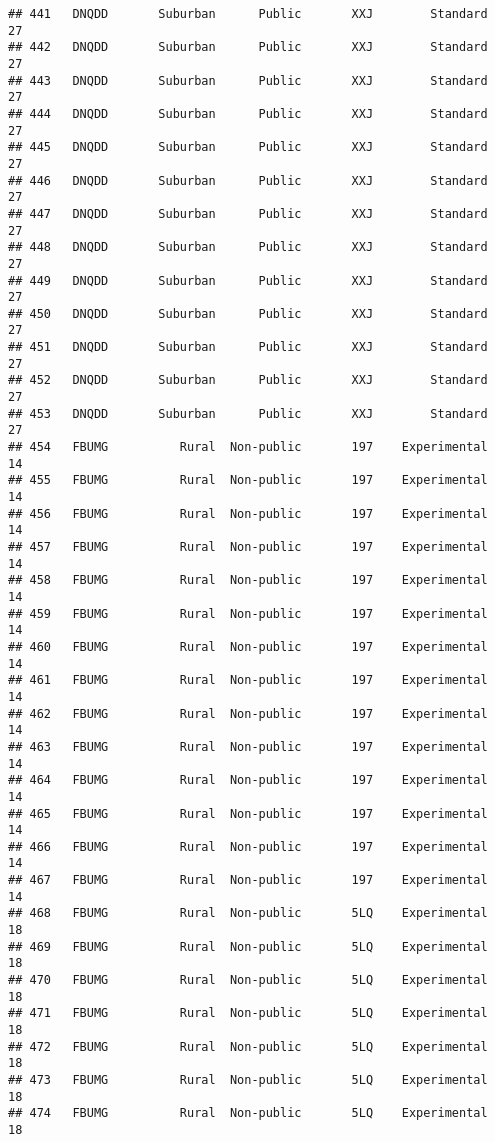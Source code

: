 \documentclass[
]{article}
\begin{document}
\begin{verbatim}
## 441   DNQDD       Suburban      Public       XXJ        Standard        27
## 442   DNQDD       Suburban      Public       XXJ        Standard        27
## 443   DNQDD       Suburban      Public       XXJ        Standard        27
## 444   DNQDD       Suburban      Public       XXJ        Standard        27
## 445   DNQDD       Suburban      Public       XXJ        Standard        27
## 446   DNQDD       Suburban      Public       XXJ        Standard        27
## 447   DNQDD       Suburban      Public       XXJ        Standard        27
## 448   DNQDD       Suburban      Public       XXJ        Standard        27
## 449   DNQDD       Suburban      Public       XXJ        Standard        27
## 450   DNQDD       Suburban      Public       XXJ        Standard        27
## 451   DNQDD       Suburban      Public       XXJ        Standard        27
## 452   DNQDD       Suburban      Public       XXJ        Standard        27
## 453   DNQDD       Suburban      Public       XXJ        Standard        27
## 454   FBUMG          Rural  Non-public       197    Experimental        14
## 455   FBUMG          Rural  Non-public       197    Experimental        14
## 456   FBUMG          Rural  Non-public       197    Experimental        14
## 457   FBUMG          Rural  Non-public       197    Experimental        14
## 458   FBUMG          Rural  Non-public       197    Experimental        14
## 459   FBUMG          Rural  Non-public       197    Experimental        14
## 460   FBUMG          Rural  Non-public       197    Experimental        14
## 461   FBUMG          Rural  Non-public       197    Experimental        14
## 462   FBUMG          Rural  Non-public       197    Experimental        14
## 463   FBUMG          Rural  Non-public       197    Experimental        14
## 464   FBUMG          Rural  Non-public       197    Experimental        14
## 465   FBUMG          Rural  Non-public       197    Experimental        14
## 466   FBUMG          Rural  Non-public       197    Experimental        14
## 467   FBUMG          Rural  Non-public       197    Experimental        14
## 468   FBUMG          Rural  Non-public       5LQ    Experimental        18
## 469   FBUMG          Rural  Non-public       5LQ    Experimental        18
## 470   FBUMG          Rural  Non-public       5LQ    Experimental        18
## 471   FBUMG          Rural  Non-public       5LQ    Experimental        18
## 472   FBUMG          Rural  Non-public       5LQ    Experimental        18
## 473   FBUMG          Rural  Non-public       5LQ    Experimental        18
## 474   FBUMG          Rural  Non-public       5LQ    Experimental        18

\end{verbatim}
\end{document}
